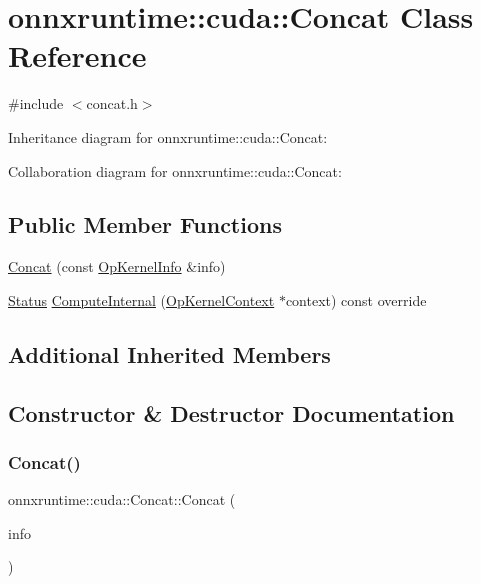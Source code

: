 \hypertarget{classonnxruntime_1_1cuda_1_1Concat}{}\section{onnxruntime\+:\+:cuda\+:\+:Concat Class Reference}
\label{classonnxruntime_1_1cuda_1_1Concat}


{\ttfamily \#include $<$concat.\+h$>$}



Inheritance diagram for onnxruntime\+:\+:cuda\+:\+:Concat\+:


Collaboration diagram for onnxruntime\+:\+:cuda\+:\+:Concat\+:
\subsection*{Public Member Functions}
\begin{DoxyCompactItemize}
\item 
\mbox{\hyperlink{classonnxruntime_1_1cuda_1_1Concat_a860600118ffc94c99c74f11843de9e28}{Concat}} (const \mbox{\hyperlink{classonnxruntime_1_1OpKernelInfo}{Op\+Kernel\+Info}} \&info)
\item 
\mbox{\hyperlink{classonnxruntime_1_1common_1_1Status}{Status}} \mbox{\hyperlink{classonnxruntime_1_1cuda_1_1Concat_aa94176487c440385c1248b6ca04772ea}{Compute\+Internal}} (\mbox{\hyperlink{classonnxruntime_1_1OpKernelContext}{Op\+Kernel\+Context}} $\ast$context) const override
\end{DoxyCompactItemize}
\subsection*{Additional Inherited Members}


\subsection{Constructor \& Destructor Documentation}
\mbox{\label{classonnxruntime_1_1cuda_1_1Concat_a860600118ffc94c99c74f11843de9e28}} 
\subsubsection{\texorpdfstring{Concat()}{Concat()}}
{\footnotesize\ttfamily onnxruntime\+::cuda\+::\+Concat\+::\+Concat (\begin{DoxyParamCaption}\item[{const \mbox{\hyperlink{classonnxruntime_1_1OpKernelInfo}{Op\+Kernel\+Info}} \&}]{info }\end{DoxyParamCaption})\hspace{0.3cm}{\ttfamily [inline]}}



